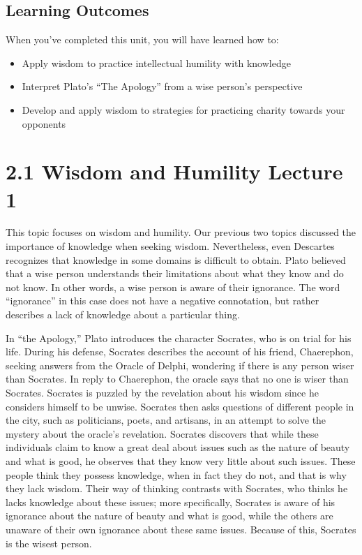\documentclass[
]{book}
\providecommand{\tightlist}{%
  \setlength{\itemsep}{0pt}\setlength{\parskip}{0pt}}
\begin{document}
\hypertarget{learning-outcomes-1}{%
\subsection*{Learning Outcomes}\label{learning-outcomes-1}}

When you've completed this unit, you will have learned how to:

\begin{itemize}
\tightlist
\item
  Apply wisdom to practice intellectual humility with knowledge
\item
  Interpret Plato's ``The Apology'' from a wise person's perspective
\item
  Develop and apply wisdom to strategies for practicing charity towards your opponents
\end{itemize}

\hypertarget{wisdom-and-humility-lecture-1}{%
\section*{2.1 Wisdom and Humility Lecture 1}\label{wisdom-and-humility-lecture-1}}

This topic focuses on wisdom and humility. Our previous two topics discussed the importance of knowledge when seeking wisdom. Nevertheless, even Descartes recognizes that knowledge in some domains is difficult to obtain. Plato believed that a wise person understands their limitations about what they know and do not know. In other words, a wise person is aware of their ignorance. The word ``ignorance'' in this case does not have a negative connotation, but rather describes a lack of knowledge about a particular thing.

In ``the Apology,'' Plato introduces the character Socrates, who is on trial for his life. During his defense, Socrates describes the account of his friend, Chaerephon, seeking answers from the Oracle of Delphi, wondering if there is any person wiser than Socrates. In reply to Chaerephon, the oracle says that no one is wiser than Socrates. Socrates is puzzled by the revelation about his wisdom since he considers himself to be unwise. Socrates then asks questions of different people in the city, such as politicians, poets, and artisans, in an attempt to solve the mystery about the oracle's revelation. Socrates discovers that while these individuals claim to know a great deal about issues such as the nature of beauty and what is good, he observes that they know very little about such issues. These people think they possess knowledge, when in fact they do not, and that is why they lack wisdom. Their way of thinking contrasts with Socrates, who thinks he lacks knowledge about these issues; more specifically, Socrates is aware of his ignorance about the nature of beauty and what is good, while the others are unaware of their own ignorance about these same issues. Because of this, Socrates is the wisest person.
\end{document}

